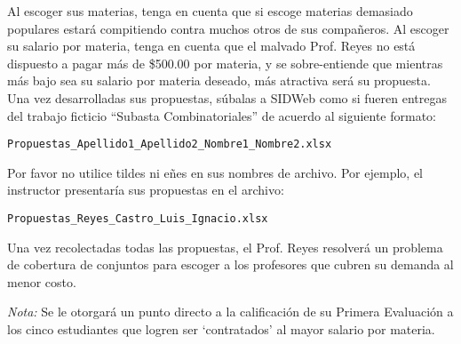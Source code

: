 \documentclass[ a4paper, twoside, 11pt]{article}
\begin{document}
Al escoger sus materias, tenga en cuenta que si escoge materias demasiado populares estar\'a compitiendo contra muchos otros de sus compa\~neros. Al escoger su salario por materia, tenga en cuenta que el malvado Prof. Reyes no est\'a dispuesto a pagar m\'as de \$500.00 por materia, y se sobre-entiende que mientras m\'as bajo sea su salario por materia deseado, m\'as atractiva ser\'a su propuesta. Una vez desarrolladas sus propuestas, s\'ubalas a SIDWeb como si fueren entregas del trabajo ficticio ``Subasta Combinatoriales'' de acuerdo al siguiente formato: 
\begin{center}
\texttt{Propuestas\_Apellido1\_Apellido2\_Nombre1\_Nombre2.xlsx}
\end{center}
Por favor no utilice tildes ni e\~nes en sus nombres de archivo. Por ejemplo, el instructor presentar\'ia sus propuestas en el archivo: 
\begin{center}
\texttt{Propuestas\_Reyes\_Castro\_Luis\_Ignacio.xlsx}
\end{center}



Una vez recolectadas todas las propuestas, el Prof. Reyes resolver\'a un problema de cobertura de conjuntos para escoger a los profesores que cubren su demanda al menor costo. 

\emph{Nota:} Se le otorgar\'a un punto directo a la calificaci\'on de su Primera Evaluaci\'on a los cinco estudiantes que logren ser `contratados' al mayor salario por materia. 
\end{document}
